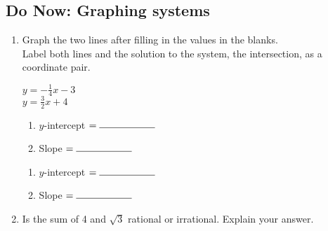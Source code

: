 \documentclass[12pt, twoside]{article}
\begin{document}
\subsection*{Do Now: Graphing systems}
  \begin{enumerate}

    \item Graph the two lines after filling in the values in the blanks.\\[0.5cm]
    Label both lines and the solution to the system, the intersection, as a coordinate pair.\\

    \begin{multicols}{2}
      $y=-\frac{1}{4} x -3$ \\
      $y=\frac{3}{2} x +4$
    \end{multicols}
    \begin{multicols}{2}
      \raggedcolumns
      \begin{enumerate}
        \item $y$-intercept $= \rule{2cm}{0.15mm}$ \\[0.5cm]
        \item Slope \hspace{0.7cm} $= \rule{2cm}{0.15mm}$\\[0.5cm]
      \end{enumerate}
      \begin{enumerate}
        \item $y$-intercept $= \rule{2cm}{0.15mm}$ \\[0.5cm]
        \item Slope \hspace{0.7cm} $= \rule{2cm}{0.15mm}$\\[0.5cm]
      \end{enumerate}
    \end{multicols}

    \begin{center} %
    \end{center}

\item Is the sum of 4 and $\sqrt{3}$ rational or irrational. Explain your answer.


\end{enumerate}
\end{document}
